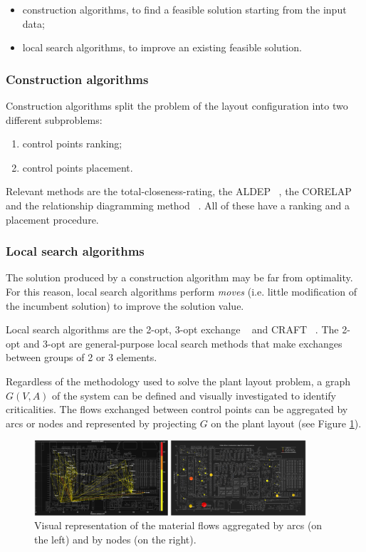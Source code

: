 \begin{itemize}
    \item construction algorithms, to find a feasible solution starting from the input data;
    \item local search algorithms, to improve an existing feasible solution.

\end{itemize}

\subsubsection{Construction algorithms}
Construction algorithms split the problem of the layout configuration into two different subproblems:

\begin{enumerate}
    \item control points ranking;
    \item control points placement.

\end{enumerate}

Relevant methods are the total-closeness-rating, the ALDEP ~\cite{Rosenblatt1979}, the CORELAP ~\cite{Adendorff1972} and the relationship diagramming method ~\cite{Plotnick2007}. All of these have a ranking and a placement procedure.

\subsubsection{Local search algorithms}
The solution produced by a construction algorithm may be far from optimality. For this reason, local search algorithms perform \textit{moves} (i.e. little modification of the incumbent solution) to improve the solution value.\par

Local search algorithms are the 2-opt, 3-opt exchange ~\cite{Potvin1989} and CRAFT ~\cite{Scriabin1985}. The 2-opt and 3-opt are general-purpose local search methods that make exchanges between groups of 2 or 3 elements.

Regardless of the methodology used to solve the plant layout problem, a graph $G\left(V,A\right)$ of the system can be defined and visually investigated to identify criticalities. The flows exchanged between control points can be aggregated by arcs or nodes and represented by projecting $G$ on the plant layout (see Figure \ref{prod_layout_visual}).

\begin{figure}[hbt!]
\centering
\includegraphics[width=0.9\textwidth]{sectionProduction/design_plant_figures/prod_layout_visual.png}
\captionsetup{type=figure}
\caption{Visual representation of the material flows aggregated by arcs (on the left) and by nodes (on the right).}
\label{prod_layout_visual}
\end{figure}

